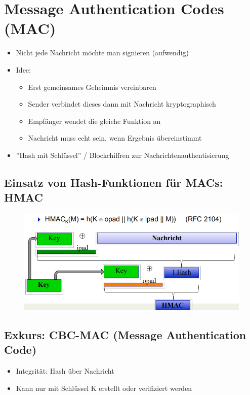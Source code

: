 \documentclass[openany]{book}
\begin{document}
\section{Message Authentication Codes (MAC)}

\begin{itemize}
    \item Nicht jede Nachricht möchte man signieren (aufwendig)
    \item Idee:
    \begin{itemize}
        \item Erst gemeinsames Geheimnis vereinbaren
        \item Sender verbindet dieses dann mit Nachricht kryptographisch
        \item Empfänger wendet die gleiche Funktion an
        \item Nachricht muss echt sein, wenn Ergebnis übereinstimmt
    \end{itemize}
    \item ''Hash mit Schlüssel'' / Blockchiffren zur Nachrichtenauthentisierung
\end{itemize}

\subsection{Einsatz von Hash-Funktionen für MACs: HMAC}

\begin{figure}[h!]
    \centering
    \includegraphics[width=0.75\linewidth]{Pics/Hashing9.PNG}
\end{figure} 

\newpage

\subsection{Exkurs: CBC-MAC (Message Authentication Code)}

\begin{itemize}
    \item Integrität: Hash über Nachricht
    \item Kann nur mit Schlüssel K erstellt oder verifiziert werden
\end{itemize}
\end{document}
